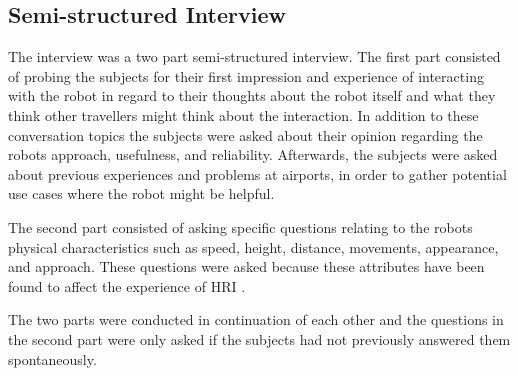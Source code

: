 \subsection{Semi-structured Interview}
The interview was a two part semi-structured interview. The first part consisted of probing the subjects for their first impression and experience of interacting with the robot in regard to their thoughts about the robot itself and what they think other travellers might think about the interaction. In addition to these conversation topics the subjects were asked about their opinion regarding the robots approach, usefulness, and reliability. Afterwards, the subjects were asked about previous experiences and problems at airports, in order to gather potential use cases where the robot might be helpful. 


%
%
The second part consisted of asking specific questions relating to the robots physical characteristics such as speed, height, distance, movements, appearance, and approach. These questions were asked because these attributes have been found to affect the experience of HRI \cite{PDF:HowMayIServeYou}.

The two parts were conducted in continuation of each other and the questions in the second part were only asked if the subjects had not previously answered them spontaneously.
 
